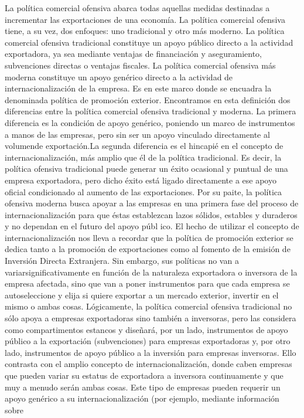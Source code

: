 \documentclass[10pt,a4paper]{article}
\begin{document}
La política comercial ofensiva abarca todas aquellas medidas destinadas a incrementar las exportaciones de una economía. La política comercial ofensiva tiene, a su vez, dos enfoques: uno tradicional y otro más moderno. La política comercial ofensiva tradicional constituye un apoyo público directo a la actividad exportadora, ya sea mediante ventajas de financiación y aseguramiento, subvenciones directas o ventajas fiscales. La política comercial ofensiva más moderna constituye un apoyo genérico directo a la actividad de internacionalización de la empresa. Es en este marco donde se encuadra la denominada política de promoción exterior. Encontramos en esta definición dos diferencias entre la política comercial ofensiva tradicional y moderna. La primera diferencia es la condición de apoyo genérico, poniendo un marco de instrumentos a manos de las empresas, pero sin ser un apoyo vinculado directamente al volumende exportación.La segunda diferencia es el hincapié en el concepto de internacionalización, más amplio que él de la política tradicional. Es decir, la política ofensiva tradicional puede generar un éxito ocasional y puntual de una empresa exportadora, pero dicho éxito está ligado directamente a ese apoyo oficial condicionado al aumento de las exportaciones. Por su paite, la política ofensiva moderna busca apoyar a las empresas en una primera fase del proceso de internacionalización para que éstas establezcan lazos sólidos, estables y duraderos y no dependan en el futuro del apoyo públ ico. El hecho de utilizar el concepto de internacionalización nos lleva a recordar que la política de promoción exterior se dedica tanto a la promoción de exportaciones como al fomento de la emisión de Inversión Directa Extranjera. Sin embargo, sus políticas no van a variarsignificativamente en función de la naturaleza exportadora o inversora de la empresa afectada, sino que van a poner instrumentos para que cada empresa se autoseleccione y elija si quiere exportar a un mercado exterior, invertir en el mismo o ambas cosas. Lógicamente, la política comercial ofensiva tradicional no sólo apoya a empresas exportadoras sino también a inversoras, pero las considera como compartimentos estancos y diseñará, por un lado, instrumentos de apoyo público a la exportación (subvenciones) para empresas exportadoras y, por otro lado, instrumentos de apoyo público a la inversión para empresas inversoras. Ello contrasta con el amplio concepto de internacionalización, donde caben empresas que pueden variar su estatus de exportadora a inversora continuamente y que muy a menudo serán ambas cosas. Este tipo de empresas pueden requerir un apoyo genérico a su internacionalización (por ejemplo, mediante información sobre
\end{document}

